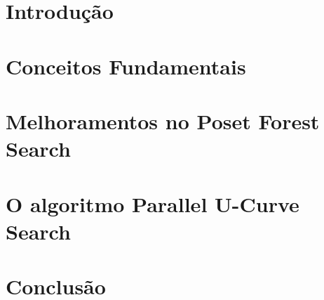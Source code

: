\documentclass[12pt, twoside]{report}
\numberwithin{mydefinition}{section}
\numberwithin{mytheorem}{section}
\numberwithin{mylemma}{section}
\begin{document}
\tableofcontents

\clearpage
{} 

\nocite{*}
\chapter{Introdução}


\chapter{Conceitos Fundamentais}


\chapter{Melhoramentos no Poset Forest Search}


\chapter{O algoritmo Parallel U-Curve Search}


\chapter{Conclusão}


\newpage
\printbibliography
\end{document}
